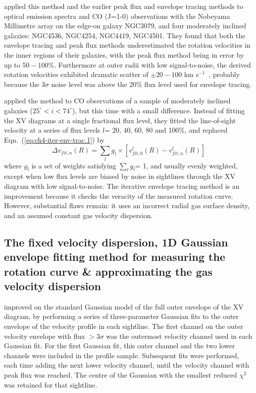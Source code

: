 \documentclass[traditabstract]{aa} %
\newcommand\kms{km s$^{-1}$}
\begin{document}
\citet{ts2002} applied this method and the earlier peak flux and
envelope tracing methods to optical emission spectra and CO (J=1-0)
observations with the Nobeyama Millimetre array on the edge-on galaxy
NGC3079, and four moderately inclined galaxies: NGC4536, NGC4254,
NGC4419, NGC4501.  They found that both the envelope tracing and peak
flux methods underestimated the rotation velocities in the inner
regions of their galaxies, with the peak flux method being in error by
up to $50-100\%$. Furthermore at outer radii with low signal-to-noise, the
derived rotation velocities exhibited dramatic scatter of $\pm 20-100$
\kms\ \citep[see Fig.~4 of ][]{ts2002}, probably because the $3\sigma$
noise level was above the $20\%$ flux level used for envelope tracing.

\citet{skno2003} applied the method to CO observations
of a sample of moderately inclined galaxies ($25^{\circ} < i < 74^{\circ}$), but
this time with a small difference.  Instead of fitting the XV diagrams at a
single fractional flux level, they fitted the line-of-sight velocity at a
series of flux levels $l$= 20, 40, 60, 80 and 100\%, and replaced
Eqn.~(\ref{eq:ch4-iter-env-trac.1}) by
\begin{equation}
  \Delta v_{fit,n}(R) = \sum_l g_l \times \left[ v^l_{fit,0}(R) -
   v^l_{fit,n}(R) \right]
\end{equation}
where $g_l$ is a set of weights satisfying $\sum_l g_l$= 1, and
usually evenly weighted, except when low flux levels are biased by
noise in sightlines through the XV diagram with low signal-to-noise.  The
iterative envelope tracing method is an improvement because it checks the 
veracity of the measured rotation curve. However, substantial flaws remain: 
it uses an incorrect radial gas surface density, and an assumed constant gas 
velocity dispersion.

\subsection{The fixed velocity dispersion, 1D Gaussian envelope
  fitting method for measuring the rotation curve \& approximating the
  gas velocity dispersion}
\label{sec:fixed-disp-iter-envtrac-RC}

\citet{grsk2002} improved on the standard Gaussian model of the full
outer envelope of the XV diagram, by performing a series of three-parameter
Gaussian fits to the outer envelope of the velocity profile in each
sightline. The first channel on the outer velocity envelope with flux $>
3\sigma$ was the outermost velocity channel used in each Gaussian fit. 
For the first Gaussian fit, this outer channel and the two
lower channels were included in the profile sample. Subsequent fits were
performed, each time adding the next lower velocity channel, until the
velocity channel with peak flux was reached. The centre of the Gaussian
with the smallest reduced $\chi^2$ was retained for that sightline.
\end{document}
